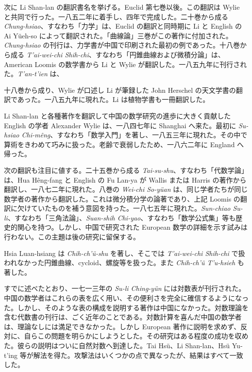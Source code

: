 \documentclass[11pt]{article}
\newcommand{\scanpage}[2]{\clearpage\setcounter{footnote}{0}\noindent{\footnotesize\color{gray}PDF #1 頁 · #2}\par\medskip}
\newcommand{\scanfooter}{}
\begin{document}
次に Li Shan-lan の翻訳書名を挙げる。Euclid 第七巻以後。この翻訳は Wylie と共同で行った。一八五二年に着手し、四年で完成した。二十巻から成る \emph{Chung-hsiao}、すなわち「力学」は、Euclid の翻訳と同時期に Li と English の Ai Yüeh-so によって翻訳された。「曲線論」三巻がこの著作に付加された。\emph{Chung-hsiao} の刊行は、力学書が中国で印刷された最初の例であった。十八巻から成る \emph{T'ai-wei-chi Shih-chi}、すなわち「円錐曲線および微積分論」は、American Loomis の数学書から Li と Wylie が翻訳した。一八五九年に刊行された。\emph{T'an-t'ien} は、
\scanfooter

\scanpage{0141}{第18章、印刷頁127}
十八巻から成り、Wylie が口述し Li が筆録した John Herschel の天文学書の翻訳であった。一八五九年に現れた。Li は植物学書も一冊翻訳した。

Li Shan-lan と各種著作を翻訳して中国の数学研究の進歩に大きく貢献した English の学者 Alexander Wylie は、一八四七年に Shanghai へ来た。最初に \emph{Su-hsiao Chi-mêng}、すなわち「数学入門」を著し、一八五三年に現れた。その中で算術をきわめて巧みに扱った。老齢で衰弱したため、一八六二年に England へ帰った。

次の翻訳も注目に値する。二十五巻から成る \emph{Tai-su-shu}、すなわち「代数学論」は、Hua Hêng-fang と English の Fu Lan-ya が Wallis または Harris の著作から翻訳し、一八七二年に現れた。八巻の \emph{Wei-chi So-yüan} は、同じ学者たちが同じ数学者の著作から翻訳した。これは微分積分学の論著であり、上記 Loomis の翻訳に欠けていたものを補う意図を持った。一八七五年に現れた。\emph{Sun-chiao Su-li}、すなわち「三角法論」、\emph{Suan-shih Chi-yao}、すなわち「数学公式集」等も歴史的関心を持つ。しかし、中国で研究された European 数学の詳細を示す試みは行わない。この主題は後の研究に留保する。

Hsia Luan-hsiang は \emph{Chih-ch'ü-shu} を著し、そこでは \emph{T'ai-wei-chi Shih-chi} で扱われなかった円錐曲線、cycloid、螺旋等を扱った。また \emph{Chih-ch'ü T'u-hsieh} も著した。

すでに述べたとおり、一七一三年の \emph{Su-li Ching-yün} には対数表が刊行された。中国の数学者はこれらの表を広く用い、その便利さを完全に確信するようになった。しかし、そのような表の構成を説明する著作は中国になかった。対数理論を含む代数書の刊行は、ごく近年のことである。対数計算を喜んだ中国の数学者は、理論なしには満足できなかった。しかし European 著作に説明を求めず、反対に、自らこの問題を明らかにしようとした。その研究はある程度の成功を収めた。彼らの説明はついに自然対数へ到達した。Tai Hsü、Li Shan-lan、Hsü Yu-t'ing 等が解法を得た。攻撃法はいくつかの点で異なったが、結果はすべて一致した。
\scanfooter
\end{document}
